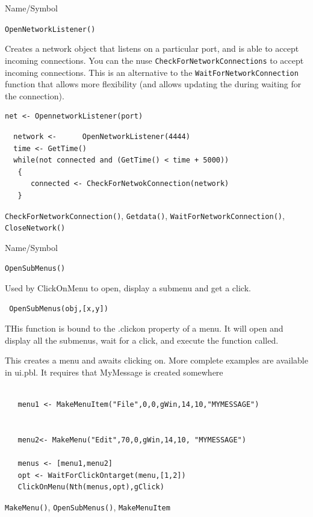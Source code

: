 \begin{desc}{Name/Symbol}
\item[Name/Symbol]	\verb+OpenNetworkListener()+

\item[Description] Creates a network object that listens on a particular port, and is able to accept incoming connections. You can the nuse \verb+CheckForNetworkConnections+ to accept incoming connections.  
This is an alternative to the \verb+WaitForNetworkConnection+ function that allows more flexibility (and allows updating the during waiting for the connection).

\item[Usage]
\begin{verbatim}
net <- OpennetworkListener(port)
\end{verbatim}

\item[Example]	
\begin{verbatim}
  network <-      OpenNetworkListener(4444) 
  time <- GetTime()
  while(not connected and (GetTime() < time + 5000))
   {
      connected <- CheckForNetwokConnection(network) 
   }

\end{verbatim}
\item[See Also]	\verb+CheckForNetworkConnection()+, \verb+Getdata()+, \verb+WaitForNetworkConnection()+, \verb+CloseNetwork()+
\end{desc}


\begin{desc}{Name/Symbol}
\item[Name/Symbol]  	\verb+OpenSubMenus()+

\item[Description]	
Used by ClickOnMenu to open, display a submenu and get a click.

\item[Usage]
\begin{verbatim}
 OpenSubMenus(obj,[x,y])
  \end{verbatim}
THis function is bound to the .clickon property of a menu. It will open and display all the submenus, wait for a click, and execute the function called.

\item[Example]      	
This creates a menu and awaits clicking on.  More complete examples are available in ui.pbl.  It requires that MyMessage is created somewhere
\begin{verbatim}

   menu1 <- MakeMenuItem("File",0,0,gWin,14,10,"MYMESSAGE")


   menu2<- MakeMenu("Edit",70,0,gWin,14,10, "MYMESSAGE")
   
   menus <- [menu1,menu2]
   opt <- WaitForClickOntarget(menu,[1,2])
   ClickOnMenu(Nth(menus,opt),gClick)
\end{verbatim}

\item[See Also]	\verb+MakeMenu()+, \verb+OpenSubMenus()+, \verb+MakeMenuItem+
\end{desc}



